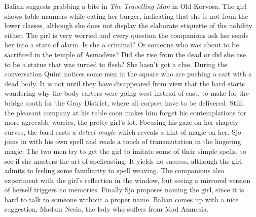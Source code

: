 Balian suggests grabbing a bite in {\itshape The Travelling Man} in Old Korvosa. The girl shows table manners while eating her burger, indicating that she is not from the lower classes, although she does not display the elaborate etiquette of the nobility either. The girl is very worried and every question the companions ask her sends her into a state of alarm. Is she a criminal? Or someone who was about to be sacrificed in the temple of Asmodeus? Did she rise from the dead or did she use to be a statue that was turned to flesh? She hasn't got a clue. During the conversation Quint notices some men in the square who are pushing a cart with a dead body. It is not until they have disappeared from view that the bard starts wandering why the body carters were going west instead of east, to make for the bridge south for the Gray District, where all corpses have to be delivered. Still, the pleasant company at his table soon makes him forget his contemplations for more agreeable worries, the pretty girl's lot. Focusing his gaze on her shapely curves, the bard casts a {\itshape detect magic} which reveals a hint of magic on her. Sjo joins in with his own spell and reads a touch of transmutation in the lingering magic. The two men try to get the girl to imitate some of their simple spells, to see if she masters the art of spellcasting. It yields no success, although the girl admits to feeling some familiarity to spell weaving. The companions also experiment with the girl's reflection in the window, but seeing a mirrored version of herself triggers no memories. Finally Sjo proposes naming the girl, since it is hard to talk to someone without a proper name. Balian comes up with a nice suggestion, Madam Nesia, the lady who suffers from Mad Amnesia.\\

